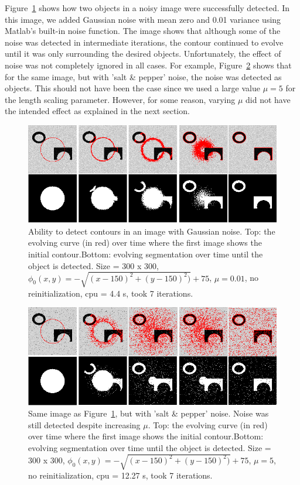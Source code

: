\documentclass[10pt,twocolumn,letterpaper]{article}
\begin{document}
Figure~\ref{fig:cv_eg10} shows how two objects in a noisy image were successfully detected. In this image, we added Gaussian noise with mean zero and 0.01
variance using Matlab's built-in noise function. The image shows that although some of the noise was detected in intermediate iterations, the contour continued
to evolve until it was only surrounding the desired objects. Unfortunately, the effect of noise was not completely ignored in all cases. For example,
Figure~\ref{fig:cv_eg11} shows that for the same image, but with 'salt \& pepper' noise, the noise was detected as objects. This should not have been the case
since we used a large value $\mu = 5$ for the length scaling parameter. However, for some reason, varying $\mu$ did not have the intended effect as explained
in the next section. 

\begin{figure}[t]
\centering
\includegraphics[width=12cm]{cv_eg10.png}
\caption{Ability to detect contours in an image with Gaussian noise.  Top: the evolving curve (in red) over time where the first
image shows the initial
contour.Bottom: evolving segmentation over time until the object is detected. Size = 300 x 300, $\phi_{0}(x,y) = - \sqrt{(x - 150)^2 + (y - 150)^2)} +
75$, $\mu =0.01$, no reinitialization, cpu = 4.4 s, took 7 iterations.}
\label{fig:cv_eg10}
\end{figure}

\begin{figure}[t]
\centering
\includegraphics[width=12cm]{cv_eg11.png}
\caption{Same image as Figure~\ref{fig:cv_eg10}, but with 'salt \& pepper' noise. Noise was still detected despite increasing $\mu$.  Top: the evolving curve
(in red) over time where the first
image shows the initial
contour.Bottom: evolving segmentation over time until the object is detected. Size = 300 x 300, $\phi_{0}(x,y) = - \sqrt{(x - 150)^2 + (y - 150)^2)} +
75$, $\mu = 5$, no reinitialization, cpu = 12.27 s, took 7 iterations.}
\label{fig:cv_eg11}
\end{figure}
\end{document}
